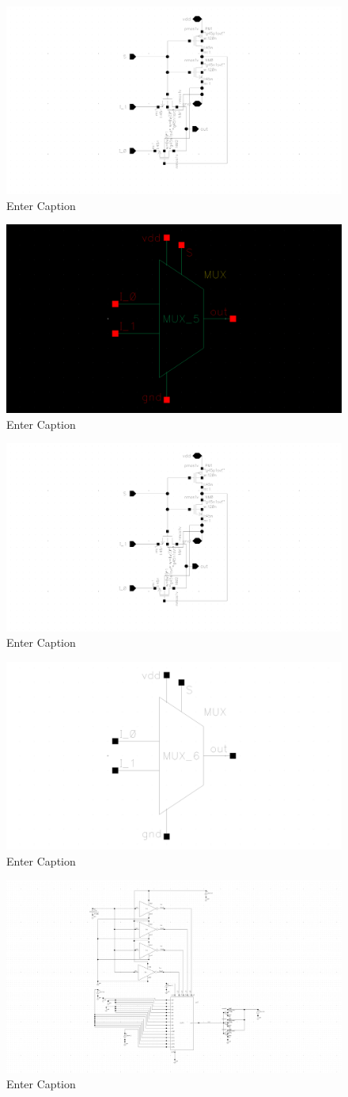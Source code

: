 \documentclass[12pt]{article}
\begin{document}
\begin{figure}[H]
    \centering
    \includegraphics[width=0.5\linewidth]{writeup//figures/updated_muxw2.png}
    \caption{Enter Caption}
\end{figure}
\begin{figure}[H]
    \centering
    \includegraphics[width=0.5\linewidth]{writeup//figures/updated_muxw2sym.png}
    \caption{Enter Caption}
\end{figure}
\begin{figure}[H]
    \centering
    \includegraphics[width=0.5\linewidth]{writeup//figures/updated_muxw3.png}
    \caption{Enter Caption}
\end{figure}
\begin{figure}[H]
    \centering
    \includegraphics[width=0.5\linewidth]{writeup//figures/updated_muxw3sym.png}
    \caption{Enter Caption}
\end{figure}

\begin{figure}[H]
    \centering
    \includegraphics[width=0.5\linewidth]{writeup//figures/updated_delay_opt_testschem.png}
    \caption{Enter Caption}
\end{figure}
\end{document}
